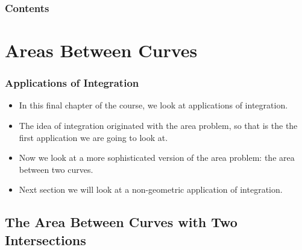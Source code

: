\documentclass[serif,ignorenonframetext]{beamer}
\title{\commonTitleZeroFiveOne}
\subtitle{\commonSubtitleZeroFiveOne}
\author{\commonAuthor}
\institute{\commonInstitute}
\date{\commonDateZeroFiveOne}
\begin{document}

\begin{frame}
  \titlepage
\end{frame}

\begin{frame}
  \frametitle{Contents}
  \tableofcontents
\end{frame}


\section{Areas Between Curves}

\begin{frame}
  \frametitle{Applications of Integration}
  \begin{itemize}[<+->]
  \item In this final chapter of the course, we look at applications
    of integration.
  \item The idea of integration originated with the area problem,
    so that is the the first application we are going to look at.
  \item Now we look at a more sophisticated version of the area
    problem: the area between two curves.
  \item Next section we will look at a non-geometric application
    of integration.
  \end{itemize}
\end{frame}

\subsection{The Area Between Curves with Two Intersections}
\end{document}
